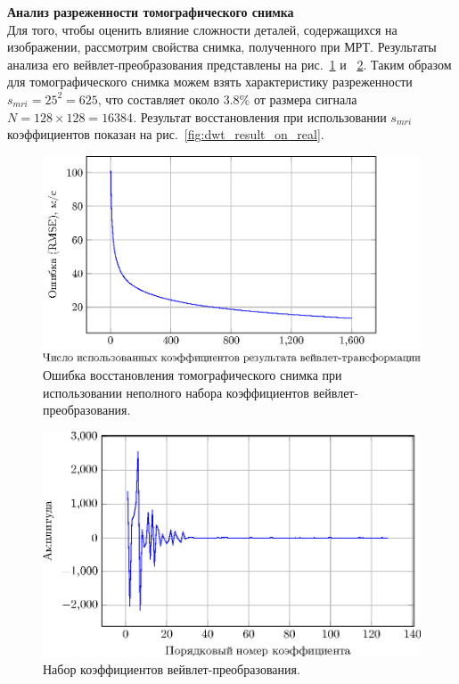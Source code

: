 \documentclass[14pt]{matmex-diploma}
\begin{document}
\textbf{Анализ разреженности томографического снимка} \\

Для того, чтобы оценить влияние сложности деталей, содержащихся на изображении, рассмотрим свойства снимка, полученного при МРТ. Результаты анализа его вейвлет-преобразования представлены на рис.~\ref{fig:used_coef_mri} и ~\ref{fig:used_coef_mri2}. Таким образом для томографического снимка можем взять характеристику разреженности $s_{mri} = 25^2 = 625$, что составляет около  $3.8\%$ от размера сигнала $N=128\times 128=16384$. Результат восстановления при использовании $s_{mri}$ коэффициентов показан на рис.~\ref{fig:dwt_result_on_real}.

\begin{figure}[h]
    \centering
    \includegraphics[width=0.8\linewidth]{pics_eps/rmse_coef_in_use_real-img.eps}
    \caption{\small Ошибка восстановления томографического снимка при использовании неполного набора коэффициентов вейвлет-преобразования.}
    \label{fig:used_coef_mri}
\end{figure}
\begin{figure}[h]
    \centering
    \includegraphics[width=0.8\linewidth]{pics_eps/line_coefs_sparse_real-img.eps}
    \caption{\small Набор коэффициентов вейвлет-преобразования.}
    \label{fig:used_coef_mri2}
\end{figure}
\end{document}
